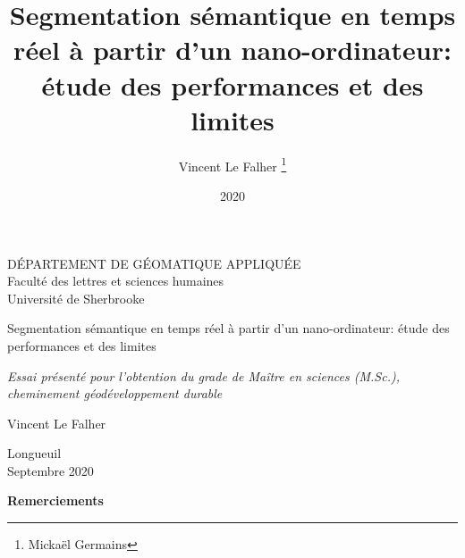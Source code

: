 \documentclass[12pt, letterpaper]{article}
\title{Segmentation sémantique en temps réel à partir d'un nano-ordinateur: étude des performances et des limites}
\author{Vincent Le Falher \thanks{Mickaël Germains}}
\date{2020}
\begin{document}
\begin{titlepage} %
   \centering %
 
   \scshape %

   DÉPARTEMENT DE GÉOMATIQUE APPLIQUÉE\\Faculté des lettres et sciences humaines\\Université de Sherbrooke

   \vspace{11\baselineskip}
 
   {\LARGE Segmentation sémantique en temps réel à partir d'un nano-ordinateur: étude des performances et des limites}
   \vspace{\baselineskip}
   \linebreak
 
   \vspace*{3\baselineskip}
 
   \textit{Essai présenté pour l'obtention du grade de Maître en sciences (M.Sc.),\\cheminement géodéveloppement durable}

   \vspace{5\baselineskip}

   {\LARGE Vincent Le Falher}

   \vfill %
 
   Longueuil\\Septembre 2020 %
   \vfill %
   \tiny{}
 
\end{titlepage}
\thispagestyle{empty}
\noindent\textbf{Remerciements}

\newpage
{}
\tableofcontents{}
\listoffigures{}
\listoftables{}
\printglossary[title=Liste des abréviations, toctitle=Liste des abréviations, type=\acronymtype, nonumberlist]
\newpage
{}
% 
\end{document}
